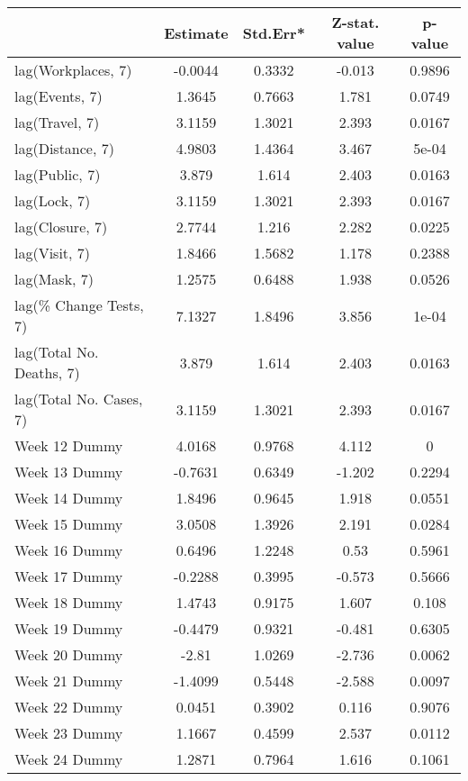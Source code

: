 \begingroup\tiny
\begin{longtable}{lcccc}
  \toprule
 & Estimate & Std.Err* & Z-stat. value & p-value \\ 
  \midrule
lag(Workplaces, 7) & -0.0044 & 0.3332 & -0.013 & 0.9896 \\ 
  lag(Events, 7) & 1.3645 & 0.7663 & 1.781 & 0.0749 \\ 
  lag(Travel, 7) & 3.1159 & 1.3021 & 2.393 & 0.0167 \\ 
  lag(Distance, 7) & 4.9803 & 1.4364 & 3.467 & 5e-04 \\ 
  lag(Public, 7) & 3.879 & 1.614 & 2.403 & 0.0163 \\ 
  lag(Lock, 7) & 3.1159 & 1.3021 & 2.393 & 0.0167 \\ 
  lag(Closure, 7) & 2.7744 & 1.216 & 2.282 & 0.0225 \\ 
  lag(Visit, 7) & 1.8466 & 1.5682 & 1.178 & 0.2388 \\ 
  lag(Mask, 7) & 1.2575 & 0.6488 & 1.938 & 0.0526 \\ 
  lag(\% Change Tests, 7) & 7.1327 & 1.8496 & 3.856 & 1e-04 \\ 
  lag(Total No. Deaths, 7) & 3.879 & 1.614 & 2.403 & 0.0163 \\ 
  lag(Total No. Cases, 7) & 3.1159 & 1.3021 & 2.393 & 0.0167 \\ 
  Week 12 Dummy & 4.0168 & 0.9768 & 4.112 & 0 \\ 
  Week 13 Dummy & -0.7631 & 0.6349 & -1.202 & 0.2294 \\ 
  Week 14 Dummy & 1.8496 & 0.9645 & 1.918 & 0.0551 \\ 
  Week 15 Dummy & 3.0508 & 1.3926 & 2.191 & 0.0284 \\ 
  Week 16 Dummy & 0.6496 & 1.2248 & 0.53 & 0.5961 \\ 
  Week 17 Dummy & -0.2288 & 0.3995 & -0.573 & 0.5666 \\ 
  Week 18 Dummy & 1.4743 & 0.9175 & 1.607 & 0.108 \\ 
  Week 19 Dummy & -0.4479 & 0.9321 & -0.481 & 0.6305 \\ 
  Week 20 Dummy & -2.81 & 1.0269 & -2.736 & 0.0062 \\ 
  Week 21 Dummy & -1.4099 & 0.5448 & -2.588 & 0.0097 \\ 
  Week 22 Dummy & 0.0451 & 0.3902 & 0.116 & 0.9076 \\ 
  Week 23 Dummy & 1.1667 & 0.4599 & 2.537 & 0.0112 \\ 
  Week 24 Dummy & 1.2871 & 0.7964 & 1.616 & 0.1061 \\ 

\end{longtable}
